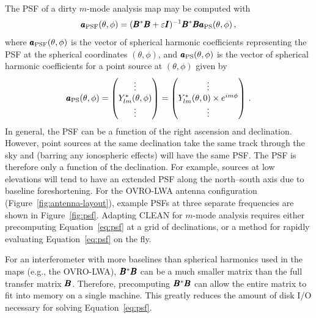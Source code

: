 \begin{bibunit}
The PSF of a dirty $m$-mode analysis map may be computed with
\begin{equation}\label{eq:psf}
    \pmb a_\text{PSF}(\theta, \phi)
        = (\pmb B^*\pmb B + \varepsilon\pmb I)^{-1}\pmb B^*\pmb B\pmb a_\text{PS}(\theta, \phi)\,,
\end{equation}
where $\pmb a_\text{PSF}(\theta, \phi)$ is the vector of spherical harmonic coefficients representing
the PSF at the spherical coordinates $(\theta, \phi)$, and $\pmb a_\text{PS}(\theta, \phi)$ is the
vector of spherical harmonic coefficients for a point source at $(\theta, \phi)$ given by
\begin{equation}
    \pmb a_\text{PS}(\theta, \phi) = \begin{pmatrix}
        \vdots \\
        Y_{lm}^*(\theta, \phi) \\
        \vdots \\
    \end{pmatrix}
    = \begin{pmatrix}
        \vdots \\
        Y_{lm}^*(\theta, 0)\times e^{im\phi} \\
        \vdots \\
    \end{pmatrix} \,.
\end{equation}
In general, the PSF can be a function of the right ascension and declination. However, point sources
at the same declination take the same track through the sky and (barring any ionospheric effects)
will have the same PSF. The PSF is therefore only a function of the declination. For example,
sources at low elevations will tend to have an extended PSF along the north--south axis due to
baseline foreshortening. For the OVRO-LWA antenna configuration (Figure~\ref{fig:antenna-layout}),
example PSFs at three separate frequencies are shown in Figure~\ref{fig:psf}.  Adapting CLEAN for
$m$-mode analysis requires either precomputing Equation~\ref{eq:psf} at a grid of declinations, or
a method for rapidly evaluating Equation~\ref{eq:psf} on the fly.

For an interferometer with more baselines than spherical harmonics used in the maps (e.g., the
OVRO-LWA), $\pmb B^*\pmb B$ can be a much smaller matrix than the full transfer matrix $\pmb B$.
Therefore, precomputing $\pmb B^*\pmb B$ can allow the entire matrix to fit into memory on a single
machine. This greatly reduces the amount of disk I/O necessary for solving Equation~\ref{eq:psf}.


\end{bibunit}
